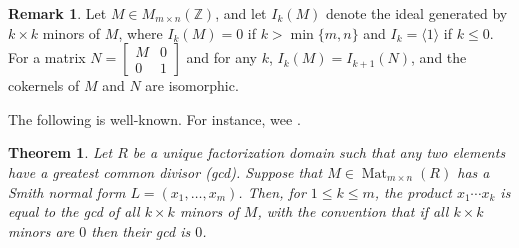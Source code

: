 \documentclass[11pt,reqno]{amsart}
\DeclareMathOperator{\Div}{Div}
\newcommand{\angles}[1]{\langle #1 \rangle}
\theoremstyle{definition}
\newtheorem{rmk}[mydef]{Remark}
\theoremstyle{plain}
\newtheorem{mytheorem}[mydef]{Theorem}
\begin{document}
\begin{rmk}\label{remark: embedding}
Let $M \in M_{m \times n}(\mathbb{Z})$, 
and let $I_k(M)$ denote the ideal generated by $k \times k$ minors of $M$, 
where $I_k(M) = 0$ if $k > \min\{m,n\}$ and $I_k = \angles{1}$ if $k \le 0$. 
For a matrix $N = \left[ \begin{array}{c|c}
M & 0 \\
\hline
0 & 1
\end{array} \right]$ and for any $k$, $I_k(M) = I_{k+1}(N)$, and the cokernels of $M$ and $N$ are isomorphic. 
\end{rmk}

The following is well-known. For instance, wee \cite[Theorem 2.4]{stanley2016smith}.

\begin{mytheorem}\label{theorem: gcd theorem}
Let $R$ be a unique factorization domain such that any two elements have a greatest common divisor (gcd). 
Suppose that $M \in \operatorname{Mat}_{m \times n}(R)$ has a Smith normal form $L=(x_1,\dots,x_m)$. 
Then, for $1\leq k \leq m$, the product $x_1 \cdots x_k$ is equal to the gcd of all $k\times k$ minors of $M$, with the convention that if all $k\times k$ minors are $0$ then their gcd is $0$. 
\end{mytheorem}


\end{document}
